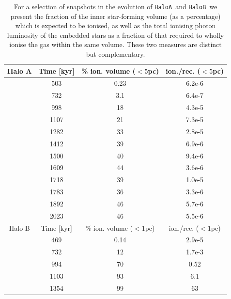 \documentclass[graphics, twocolumn, usenatbib]{mn2e}
\newcommand{\ha} {\texttt{HaloA~}}
\newcommand{\hb} {\texttt{HaloB~}}
\begin{document}
\begin{table}
    \centering
    \begin{tabular}{c|ccc}
         Halo A &  Time [kyr] & \% ion. volume ($<5$pc) & ion./rec. ($<5$pc)\\
         \hline
          & 503 & 0.23 & 6.2e-6\\ %
          & 732 & 3.1 & 6.4e-7\\ %
          & 998 & 18 & 4.3e-5\\ %
          & 1107 & 21 & 7.3e-5\\
          & 1282 & 33 & 2.8e-5\\ %
          & 1412 & 39 & 6.9e-6\\ %
          & 1500 & 40 & 9.4e-6\\%
          & 1609 & 44 & 3.6e-6 \\ %
          & 1718 & 39 & 1.0e-5 \\ %
          & 1783 & 36 & 3.3e-6 \\ %
          & 1892 & 46 & 5.7e-6 \\ %
          & 2023 & 46 & 5.5e-6 \\ %
          Halo B &  Time [kyr] & \% ion. volume ($<1$pc) & ion./rec. ($<1$pc)\\
          \hline
          & 469 & 0.14 & 2.9e-5\\
          & 732 & 12 & 1.7e-3\\
          & 994 & 70 & 0.52\\
          & 1103 & 93 & 6.1\\
          & 1354 & 99 & 63\\
    \end{tabular}
    \caption{For a selection of snapshots in the evolution of \ha and \hb we present the fraction of the inner star-forming volume (as a percentage) which is expected to be ionised, as well as the total ionising photon luminosity of the embedded stars as a fraction of that required to wholly ionise the gas within the same volume. These two measures are distinct but complementary.}%
    \label{tab:feedback}
\end{table}
\end{document}
